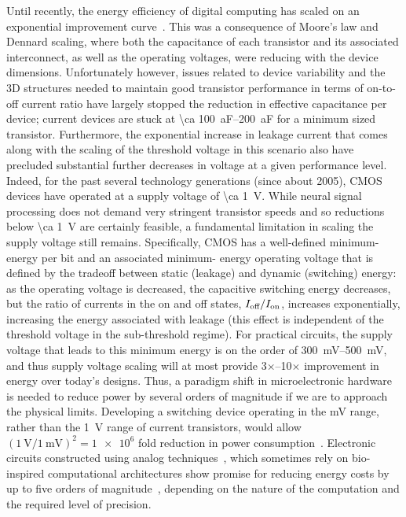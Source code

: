 Until recently, the energy efficiency of digital computing has scaled on an exponential improvement curve~\cite{koomey11}.
This was a consequence of Moore's law and Dennard scaling, where both the capacitance of each transistor and its associated interconnect, as well as the operating voltages, were reducing with the device dimensions.
Unfortunately however, issues related to device variability and the 3D structures needed to maintain good transistor performance in terms of on-to-off current ratio have largely stopped the reduction in effective capacitance per device; current devices are stuck at \SIrange{\ca 100}{200}{\atto\farad} for a minimum sized transistor.
Furthermore, the exponential increase in leakage current that comes along with the scaling of the threshold voltage in this scenario also have precluded substantial further decreases in voltage at a given performance level.
Indeed, for the past several technology generations (since about 2005), CMOS devices have operated at a supply voltage of \SI{\ca 1}{\volt}.
While neural signal processing does not demand very stringent transistor speeds and so reductions below \SI{\ca 1}{\volt} are certainly feasible, a fundamental limitation in scaling the supply voltage still remains.
Specifically, CMOS has a well-defined minimum-energy per bit and an associated minimum- energy operating voltage that is defined by the tradeoff between static (leakage) and dynamic (switching) energy:
as the operating voltage is decreased, the capacitive switching energy decreases, but the ratio of currents in the on and off states, $I_{\text{\scriptsize off}}/I_{\text{\scriptsize on}}$, increases exponentially, increasing the energy associated with leakage (this effect is independent of the threshold voltage in the sub-threshold regime).
For practical circuits, the supply voltage that leads to this minimum energy is on the order of \SIrange{300}{500}{\milli\volt}, and thus supply voltage scaling will at most provide 3$\times$--10$\times$ improvement in energy over today's designs.
Thus, a paradigm shift in microelectronic hardware is needed to reduce power by several orders of magnitude if we are to approach the physical limits.
Developing a switching device operating in the \si{\milli\volt} range, rather than the \SI{1}{\volt} range of current transistors, would allow $\left(\SI{1}{\volt}/\SI{1}{\milli\volt}\right)^2=\num{1e6}$ fold reduction in power consumption~\cite{yablonovitch08}.
Electronic circuits constructed using analog techniques~\cite{sarpeshkar98}, which sometimes rely on bio-inspired computational architectures show promise for reducing energy costs by up to five orders of magnitude~\cite{rapoport09,sarpeshkar98,mandal07}, depending on the nature of the computation and the required level of precision.

